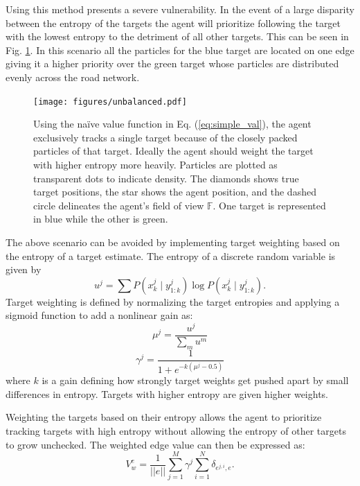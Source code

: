 \documentclass[letterpaper, 10 pt, conference]{ieeeconf}  %
\begin{document}
Using this method presents a severe vulnerability. In the event of a large disparity between the entropy of the targets the agent will prioritize following the target with the lowest entropy to the detriment of all other targets. This can be seen in Fig. \ref{fig:unbalanced}. In this scenario all the particles for the blue target are located on one edge giving it a higher priority over the green target whose particles are distributed evenly across the road network.

\begin{figure}
\centering
\texttt{[image: figures/unbalanced.pdf]}
\caption{Using the na\"ive value function in Eq. (\ref{eq:simple_val}), the agent exclusively tracks a single target because of the closely packed particles of that target. Ideally the agent should weight the target with higher entropy more heavily. Particles are plotted as transparent dots to indicate density. The diamonds shows true target positions, the star shows the agent position, and the dashed circle delineates the agent's field of view $\mathbb{F}$. One target is represented in blue while the other is green.}
\label{fig:unbalanced}
\end{figure}

The above scenario can be avoided by implementing target weighting based on the entropy of a target estimate. The entropy \cite{Shannon1948} of a discrete random variable is given by
\begin{equation}%
    u^j = \sum{P(x^j_k \mid y^j_{1:k})\log P(x^j_k \mid y^j_{1:k})}.
\end{equation}
Target weighting is defined by normalizing the target entropies and applying a sigmoid function to add a nonlinear gain as:
\begin{equation}%
    \mu^j = \frac{u^j}{\sum_m u^m}
\end{equation}
\begin{equation}\label{eq:sigmoid}
    \gamma^j = \frac{1}{1 + e^{-k(\mu^j - 0.5)}}
\end{equation}
where $k$ is a gain defining how strongly target weights get pushed apart by small differences in entropy. Targets with higher entropy are given higher weights.

Weighting the targets based on their entropy allows the agent to prioritize tracking targets with high entropy without allowing the entropy of other targets to grow unchecked. The weighted edge value can then be expressed as:
\begin{equation}\label{eq:weighted_value}
    V_w^e = \frac{1}{||e||}\sum_{j=1}^M \gamma^j \sum_{i=1}^{N}\delta_{e^{j,i},e}.
\end{equation}
\end{document}
